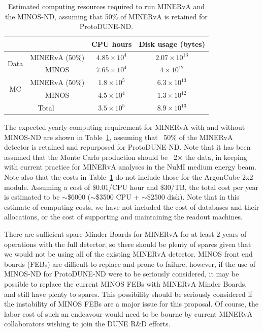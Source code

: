 \begin{table}[htbp]
  \centering  
      {\renewcommand{\arraystretch}{1.2}
        \begin{tabular}{cccc}
          \hline\hline
          & & CPU hours & Disk usage (bytes) \\
          \hline
          \multirow{2}{*}{Data} & MINERvA (50\%) & $4.85\times 10^{4}$ & $2.07\times 10^{13}$ \\
          & MINOS & $7.65\times 10^{4}$ & $4\times 10^{12}$ \\
          \hline
          \multirow{2}{*}{MC} & MINERvA (50\%) & $1.8\times 10^{5}$ & $6.3\times 10^{13}$ \\
          & MINOS & $4.5\times 10^{4}$ & $1.3\times 10^{12}$ \\          
          \hline
          \multicolumn{2}{c}{Total} & $3.5\times 10^{5}$ & $8.9\times 10^{13}$ \\
          \hline\hline
      \end{tabular}}  
      \caption{Estimated computing resources required to run MINERvA and the MINOS-ND, assuming that 50\% of MINERvA is retained for ProtoDUNE-ND.}
      \label{tab:minerva-computing}
\end{table}
The expected yearly computing requirement for MINERvA with and without MINOS-ND are shown in Table~\ref{tab:minerva-computing}, assuming that ~50\% of the MINERvA detector is retained and repurposed for ProtoDUNE-ND. Note that it has been assumed that the Monte Carlo production should be ~2$\times$ the data, in keeping with current practice for MINERvA analyses in the NuMI medium energy beam. Note also that the costs in Table~\ref{tab:minerva-computing} do not include those for the ArgonCube 2x2 module. Assuming a cost of \$0.01/CPU hour and \$30/TB, the total cost per year is estimated to be $\sim$\$6000 ($\sim$\$3500 CPU + $\sim$\$2500 disk). Note that in this estimate of computing costs, we have not included the cost of databases and their allocations, or the cost of supporting and maintaining the readout machines.

There are sufficient spare Minder Boards for MINERvA for at least 2 years of operations with the full detector, so there should be plenty of spares given that we would not be using all of the existing MINERvA detector. MINOS front end boards (FEBs) are difficult to replace and prone to failure, however, if the use of MINOS-ND for ProtoDUNE-ND were to be seriously considered, it may be possible to replace the current MINOS FEBs with MINERvA Minder Boards, and still have plenty to spares. This possibility should be seriously considered if the instability of MINOS FEBs are a major issue for this proposal. Of course, the labor cost of such an endeavour would need to be bourne by current MINERvA collaborators wishing to join the DUNE R\&D efforts. 


